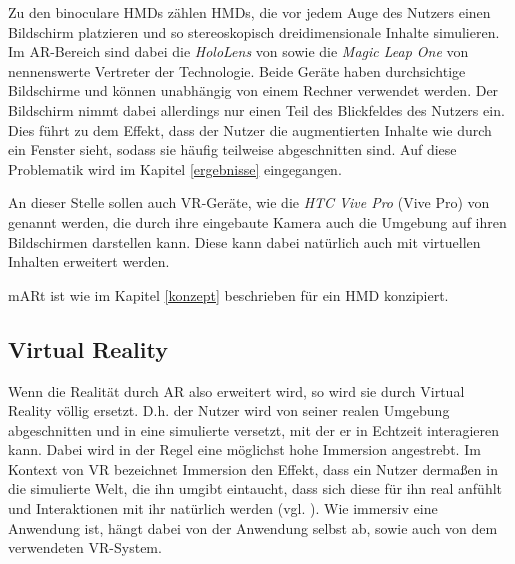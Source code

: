 Zu den binoculare HMDs zählen HMDs, die vor jedem Auge des Nutzers einen Bildschirm platzieren und so stereoskopisch dreidimensionale Inhalte simulieren. Im AR-Bereich sind dabei die \textit{HoloLens} von \cite{hololens} sowie die \textit{Magic Leap One} von \cite{magicLeap} nennenswerte Vertreter der Technologie. Beide Geräte haben durchsichtige Bildschirme und können unabhängig von einem Rechner verwendet werden. 
Der Bildschirm nimmt dabei allerdings nur einen Teil des Blickfeldes des Nutzers ein. Dies führt zu dem Effekt, dass der Nutzer die augmentierten Inhalte wie durch ein Fenster sieht, sodass sie häufig teilweise abgeschnitten sind. Auf diese Problematik wird im Kapitel \ref{ergebnisse} eingegangen. 

An dieser Stelle sollen auch VR-Geräte, wie die \textit{HTC Vive Pro} (Vive Pro) von \cite{vivePro} genannt werden, die durch ihre eingebaute Kamera auch die Umgebung auf ihren Bildschirmen darstellen kann. Diese kann dabei natürlich auch mit virtuellen Inhalten erweitert werden. 

mARt ist wie im Kapitel \ref{konzept} beschrieben für ein HMD konzipiert.


\subsection{Virtual Reality}
\label{vr}

Wenn die Realität durch AR also erweitert wird, so wird sie durch Virtual Reality völlig ersetzt. D.h. der Nutzer wird von seiner realen Umgebung abgeschnitten und in eine simulierte versetzt, mit der er in Echtzeit 
interagieren kann. Dabei wird in der Regel eine möglichst hohe Immersion angestrebt. 
Im Kontext von VR bezeichnet Immersion den Effekt, dass ein Nutzer dermaßen in die simulierte Welt, die ihn umgibt eintaucht, dass sich diese für ihn real anfühlt und Interaktionen mit ihr natürlich werden (vgl. \cite{Witmer98}). Wie immersiv eine Anwendung ist, hängt dabei von der Anwendung selbst ab, sowie auch von dem verwendeten VR-System. 

